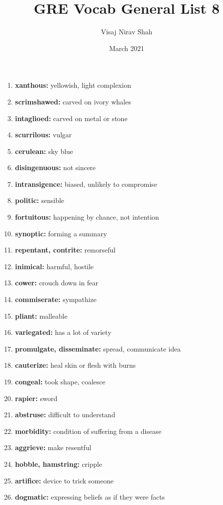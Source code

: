 \documentclass{article}
\title{\textbf{GRE Vocab General List 8}}
\author{Visaj Nirav Shah}
\date{March 2021}
\begin{document}
\maketitle

\begin{enumerate}
    \item \textbf{xanthous: }{yellowish, light complexion}
    \item \textbf{scrimshawed: }{carved on ivory whales}
    \item \textbf{intaglioed: }{carved on metal or stone}
    \item \textbf{scurrilous: }{vulgar}
    \item \textbf{cerulean: }{sky blue}
    \item \textbf{disingenuous: }{not sincere}
    \item \textbf{intransigence: }{biased, unlikely to compromise}
    \item \textbf{politic: }{sensible}
    \item \textbf{fortuitous: }{happening by chance, not intention}
    \item \textbf{synoptic: }{forming a summary}
    \item \textbf{repentant, contrite: }{remorseful}
    \item \textbf{inimical: }{harmful, hostile}
    \item \textbf{cower: }{crouch down in fear}
    \item \textbf{commiserate: }{sympathize}
    \item \textbf{pliant: }{malleable}
    \item \textbf{variegated: }{has a lot of variety}
    \item \textbf{promulgate, disseminate: }{spread, communicate idea}
    \item \textbf{cauterize: }{heal skin or flesh with burns}
    \item \textbf{congeal: }{took shape, coalesce}
    \item \textbf{rapier: }{sword}
    \item \textbf{abstruse: }{difficult to understand}
    \item \textbf{morbidity: }{condition of suffering from a disease}
    \item \textbf{aggrieve: }{make resentful}
    \item \textbf{hobble, hamstring: }{cripple}
    \item \textbf{artifice: }{device to trick someone}
    \item \textbf{dogmatic: }{expressing beliefs as if they were facts}

\end{enumerate}
\end{document}

